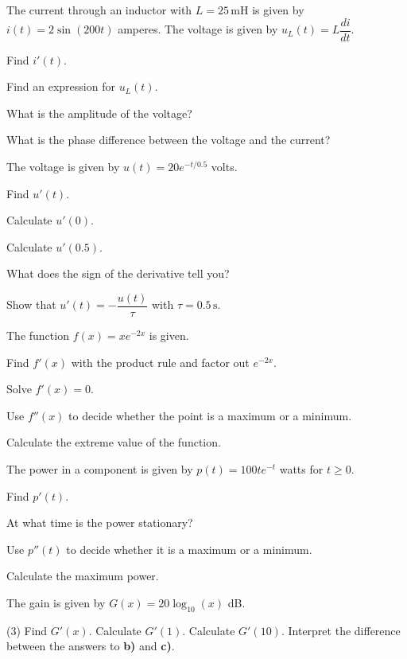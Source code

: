 The current through an inductor with $L = 25\,\text{mH}$ is given by $i(t) = 2\sin(200t)$
amperes. The voltage is given by $u_L(t) = L\dfrac{di}{dt}$.
\begin{parts}
  \item Find $i'(t)$.
  \item Find an expression for $u_L(t)$.
  \item What is the amplitude of the voltage?
  \item What is the phase difference between the voltage and the current?
\end{parts}

The voltage is given by $u(t) = 20e^{-t/0.5}$ volts.
\begin{parts}
  \item Find $u'(t)$.
  \item Calculate $u'(0)$.
  \item Calculate $u'(0.5)$.
  \item What does the sign of the derivative tell you?
  \item Show that $u'(t) = -\dfrac{u(t)}{\tau}$ with $\tau = 0.5\,\text{s}$.
\end{parts}

The function $f(x) = xe^{-2x}$ is given.
\begin{parts}
  \item Find $f'(x)$ with the product rule and factor out $e^{-2x}$.
  \item Solve $f'(x) = 0$.
  \item Use $f''(x)$ to decide whether the point is a maximum or a minimum.
  \item Calculate the extreme value of the function.
\end{parts}

The power in a component is given by $p(t) = 100te^{-t}$ watts for $t \geq 0$.
\begin{parts}
  \item Find $p'(t)$.
  \item At what time is the power stationary?
  \item Use $p''(t)$ to decide whether it is a maximum or a minimum.
  \item Calculate the maximum power.
\end{parts}

The gain is given by $G(x) = 20\log_{10}(x)$ dB.
\begin{delar}(3)
  \task Find $G'(x)$.
  \task Calculate $G'(1)$.
  \task Calculate $G'(10)$.
  \task* Interpret the difference between the answers to \textbf{b)} and \textbf{c)}.
\end{delar}

